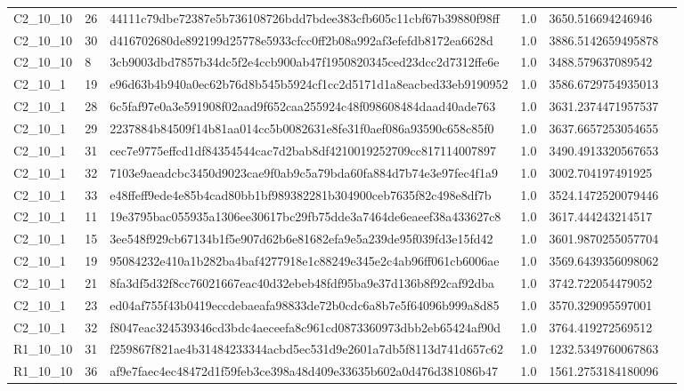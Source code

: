 \begin{tabular}{llllll}
 C2\_10\_10 & 26 & 44111c79dbe72387e5b736108726bdd7bdee383cfb605c11cbf67b39880f98ff & 1.0 & 3650.516694246946 &  \\
 C2\_10\_10 & 30 & d416702680de892199d25778e5933cfcc0ff2b08a992af3efefdb8172ea6628d & 1.0 & 3886.5142659495878 &  \\
 C2\_10\_10 & 8 & 3cb9003dbd7857b34dc5f2e4ccb900ab47f1950820345ced23dcc2d7312ffe6e & 1.0 & 3488.579637089542 &  \\
 C2\_10\_1 & 19 & e96d63b4b940a0ec62b76d8b545b5924cf1cc2d5171d1a8eacbed33eb9190952 & 1.0 & 3586.6729754935013 &  \\
 C2\_10\_1 & 28 & 6c5faf97e0a3e591908f02aad9f652caa255924c48f098608484daad40ade763 & 1.0 & 3631.2374471957537 &  \\
 C2\_10\_1 & 29 & 2237884b84509f14b81aa014cc5b0082631e8fe31f0aef086a93590c658c85f0 & 1.0 & 3637.6657253054655 &  \\
 C2\_10\_1 & 31 & cec7e9775effcd1df84354544cac7d2bab8df4210019252709cc817114007897 & 1.0 & 3490.4913320567653 &  \\
 C2\_10\_1 & 32 & 7103e9aeadcbc3450d9023cae9f0ab9c5a79bda60fa884d7b74e3e97fec4f1a9 & 1.0 & 3002.704197491925 &  \\
 C2\_10\_1 & 33 & e48ffeff9ede4e85b4cad80bb1bf989382281b304900ceb7635f82c498e8df7b & 1.0 & 3524.1472520079446 &  \\
 C2\_10\_1 & 11 & 19e3795bac055935a1306ee30617bc29fb75dde3a7464de6eaeef38a433627c8 & 1.0 & 3617.444243214517 &  \\
 C2\_10\_1 & 15 & 3ee548f929cb67134b1f5e907d62b6e81682efa9e5a239de95f039fd3e15fd42 & 1.0 & 3601.9870255057704 &  \\
 C2\_10\_1 & 19 & 95084232e410a1b282ba4baf4277918e1c88249e345e2c4ab96ff061cb6006ae & 1.0 & 3569.6439356098062 &  \\
 C2\_10\_1 & 21 & 8fa3df5d32f8cc76021667eac40d32ebeb48fdf95ba9e37d136b8f92caf92dba & 1.0 & 3742.722054479052 &  \\
 C2\_10\_1 & 23 & ed04af755f43b0419eccdebaeafa98833de72b0cdc6a8b7e5f64096b999a8d85 & 1.0 & 3570.329095597001 &  \\
 C2\_10\_1 & 32 & f8047eac324539346cd3bdc4aeceefa8c961cd0873360973dbb2eb65424af90d & 1.0 & 3764.419272569512 &  \\
 R1\_10\_10 & 31 & f259867f821ae4b31484233344acbd5ec531d9e2601a7db5f8113d741d657c62 & 1.0 & 1232.5349760067863 &  \\
 R1\_10\_10 & 36 & af9e7faec4ec48472d1f59feb3ce398a48d409e33635b602a0d476d381086b47 & 1.0 & 1561.2753184180096 &  \\

\end{tabular}
